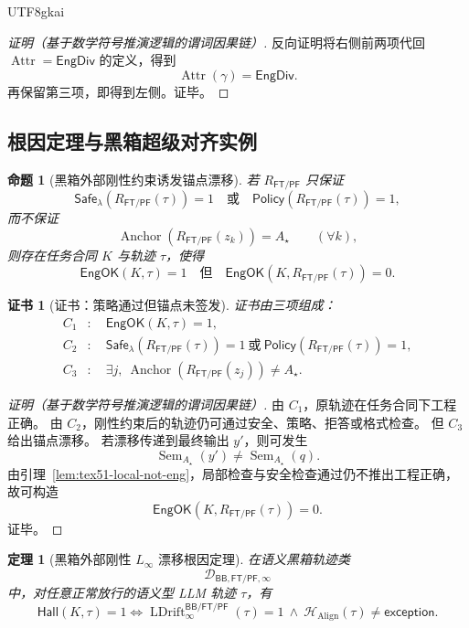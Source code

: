 \documentclass[12pt]{article}
\newtheorem{theorem}{定理}[section]
\newtheorem{proposition}{命题}[section]
\newtheorem{Certificate}{证书}[section]
\newcommand{\Linfty}{\ensuremath{L_\infty}}
\newcommand{\Policy}{\mathsf{Policy}}
\newcommand{\Safe}{\mathsf{Safe}}
\newcommand{\EngOK}{\mathsf{EngOK}}
\newcommand{\Hall}{\mathsf{Hall}}
\newcommand{\Exc}{\mathsf{exception}}
\newcommand{\FTPF}{\mathsf{FT/PF}}
\newcommand{\BB}{\mathsf{BB}}
\newcommand{\Sem}{\operatorname{Sem}}
\newcommand{\Align}{\operatorname{Align}}
\newcommand{\Anchor}{\operatorname{Anchor}}
\newcommand{\LDrift}{\operatorname{LDrift}}
\newcommand{\Attr}{\operatorname{Attr}}
\newcommand{\EngDiv}{\mathsf{EngDiv}}
\begin{document}
\begin{CJK*}{UTF8}{gkai}
\begin{proof}[证明（基于数学符号推演逻辑的谓词因果链）]
反向证明将右侧前两项代回 \(\Attr=\EngDiv\) 的定义，得到
\[
  \Attr(\gamma)=\EngDiv.
\]
再保留第三项，即得到左侧。证毕。
\end{proof}

\subsection{根因定理与黑箱超级对齐实例}
\label{subsec:tex51-root-theorem}

\begin{proposition}[黑箱外部刚性约束诱发锚点漂移]
\label{prop:tex51-ftpf-drift}
若 \(R_{\FTPF}\) 只保证
\[
  \Safe_\lambda(R_{\FTPF}(\tau))=1
  \quad\text{或}\quad
  \Policy(R_{\FTPF}(\tau))=1,
\]
而不保证
\[
  \Anchor(R_{\FTPF}(z_k))=A_\star
  \qquad(\forall k),
\]
则存在任务合同 \(K\) 与轨迹 \(\tau\)，使得
\[
  \EngOK(K,\tau)=1
  \quad\text{但}\quad
  \EngOK(K,R_{\FTPF}(\tau))=0.
\]
\end{proposition}

\begin{Certificate}[证书：策略通过但锚点未签发]
\label{cert:tex51-ftpf-drift}
证书由三项组成：
\[
\begin{aligned}
  C_1&:\quad \EngOK(K,\tau)=1,\\
  C_2&:\quad \Safe_\lambda(R_{\FTPF}(\tau))=1\ \text{或}\ \Policy(R_{\FTPF}(\tau))=1,\\
  C_3&:\quad \exists j,\ \Anchor(R_{\FTPF}(z_j))\ne A_\star.
\end{aligned}
\]
\end{Certificate}

\begin{proof}[证明（基于数学符号推演逻辑的谓词因果链）]
由 \(C_1\)，原轨迹在任务合同下工程正确。
由 \(C_2\)，刚性约束后的轨迹仍可通过安全、策略、拒答或格式检查。
但 \(C_3\) 给出锚点漂移。
若漂移传递到最终输出 \(y'\)，则可发生
\[
  \Sem_{A_\star}(y')\ne\Sem_{A_\star}(q).
\]
由引理~\ref{lem:tex51-local-not-eng}，局部检查与安全检查通过仍不推出工程正确，
故可构造
\[
  \EngOK(K,R_{\FTPF}(\tau))=0.
\]
证毕。
\end{proof}

\begin{theorem}[黑箱外部刚性 \texorpdfstring{\(\Linfty\)}{L-infinity} 漂移根因定理]
\label{thm:tex51-bb-ftpf-root}
在语义黑箱轨迹类
\[
  \mathcal D_{\BB,\FTPF,\infty}
\]
中，对任意正常放行的语义型 LLM 轨迹 \(\tau\)，有
\[
\boxed{
  \Hall(K,\tau)=1
  \Longleftrightarrow
  \LDrift_{\infty}^{\BB/\FTPF}(\tau)=1
  \ \wedge\
  \mathcal H_{\Align}(\tau)\ne\Exc.
}
\]
\end{theorem}


\end{CJK*}
\end{document}
